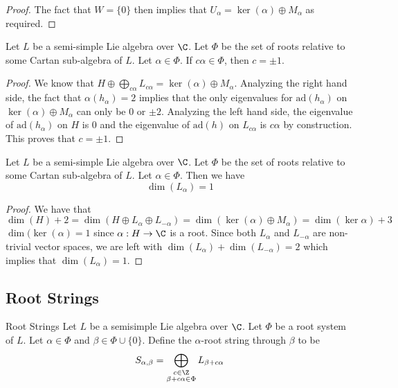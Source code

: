 \documentclass[a4paper]{article}
\begin{document}
\begin{lmm}{}{}
\begin{proof}
The fact that $W=\{0\}$ then implies that $U_\alpha=\ker(\alpha)\oplus M_\alpha$ as required. 
\end{proof}
\end{lmm}

\begin{prp}{}{} Let $L$ be a semi-simple Lie algebra over $\C$. Let $\Phi$ be the set of roots relative to some Cartan sub-algebra of $L$. Let $\alpha\in\Phi$. If $c\alpha\in\Phi$, then $c=\pm1$. \tcbline
\begin{proof}
We know that $H\oplus\bigoplus_{c\alpha} L_{c\alpha}=\ker(\alpha)\oplus M_\alpha$. Analyzing the right hand side, the fact that $\alpha(h_\alpha)=2$ implies that the only eigenvalues for $\text{ad}(h_\alpha)$ on $\ker(\alpha)\oplus M_\alpha$ can only be $0$ or $\pm2$. Analyzing the left hand side, the eigenvalue of $\text{ad}(h_\alpha)$ on $H$ is $0$ and the eigenvalue of $\text{ad}(h)$ on $L_{c\alpha}$ is $c\alpha$ by construction. This proves that $c=\pm1$. 
\end{proof}
\end{prp}

\begin{prp}{}{} Let $L$ be a semi-simple Lie algebra over $\C$. Let $\Phi$ be the set of roots relative to some Cartan sub-algebra of $L$. Let $\alpha\in\Phi$. Then we have $$\dim(L_\alpha)=1$$ \tcbline
\begin{proof}
We have that $$\dim(H)+2=\dim\left(H\oplus L_\alpha\oplus L_{-\alpha}\right)=\dim(\ker(\alpha)\oplus M_\alpha)=\dim(\ker\alpha)+3$$ $\dim(\ker(\alpha)=1$ since $\alpha:H\to\C$ is a root. Since both $L_\alpha$ and $L_{-\alpha}$ are non-trivial vector spaces, we are left with $\dim(L_\alpha)+\dim(L_{-\alpha})=2$ which implies that $\dim(L_\alpha)=1$. 
\end{proof}
\end{prp}

\subsection{Root Strings}
\begin{defn}{Root Strings}{} Let $L$ be a semisimple Lie algebra over $\C$. Let $\Phi$ be a root system of $L$. Let $\alpha\in\Phi$ and $\beta\in\Phi\cup\{0\}$. Define the $\alpha$-root string through $\beta$ to be $$S_{\alpha,\beta}=\bigoplus_{\substack{c\in\Z\\\beta+c\alpha\in\Phi}}L_{\beta+c\alpha}$$
\end{defn}
\end{document}
